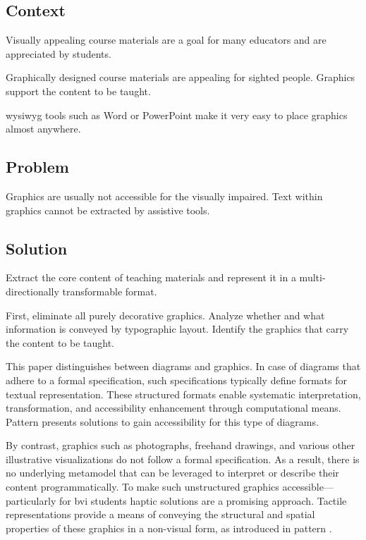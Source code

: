 \patternOne

\subsection*{Context}

Visually appealing course materials are a goal for many educators and are appreciated by students. 

Graphically designed course materials are appealing for sighted people. Graphics support the content to be taught. 

\ac{wysiwyg} tools such as Word or PowerPoint make it very easy to place graphics almost anywhere. 

\subsection*{Problem}

\begin{itshape}

Graphics are usually not accessible for the visually impaired. 
Text within graphics cannot be extracted by assistive tools.

\end{itshape}
    
    



\subsection*{Solution}

\begin{sol}
Extract the core content of teaching materials and represent it in a multi-directionally transformable format.
\end{sol}


First, eliminate all purely decorative graphics.
Analyze whether and what information is conveyed by typographic layout. 
Identify the graphics that carry the content to be taught.


This paper distinguishes between diagrams and graphics. 
In case of diagrams that adhere to a formal specification, such specifications typically define formats for textual representation. These structured formats enable systematic interpretation, transformation, and accessibility enhancement through computational means. 
Pattern \patternTwoInline presents solutions to gain accessibility for this type of diagrams. 

By contrast, graphics such as photographs, freehand drawings, and various other illustrative visualizations do not follow a formal specification. As a result, there is no underlying metamodel that can be leveraged to interpret or describe their content programmatically.
To make such unstructured graphics accessible—particularly for \ac{bvi} students haptic solutions are a promising approach. Tactile representations provide a means of conveying the structural and spatial properties of these graphics in a non-visual form, as introduced in pattern \patternThreeInline. 
 

